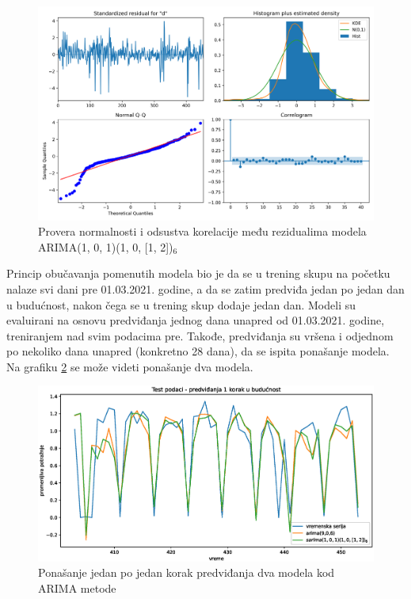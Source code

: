 \documentclass[12pt,oneside]{memoir}
\begin{document}
\begin{figure}[!ht]
  \centering
  \includegraphics[width=1\textwidth]{./grafici/reziduali_arima.png}
  \caption{Provera normalnosti i odsustva korelacije među rezidualima modela ARIMA(1, 0, 1)(1, 0, [1, 2])$_6$}
  \label{fig: reziduali}
\end{figure}
Princip obučavanja pomenutih modela bio je da se u trening skupu na početku nalaze svi dani pre 01.03.2021. godine, a da se zatim predviđa jedan po jedan dan u budućnost, nakon čega se u trening skup dodaje jedan dan. Modeli su evaluirani na osnovu predviđanja jednog dana unapred od 01.03.2021. godine, treniranjem nad svim podacima pre. Takođe, predviđanja su vršena i odjednom po nekoliko dana unapred (konkretno 28 dana), da se ispita ponašanje modela. Na grafiku \ref{fig: test_arima} se može videti ponašanje dva modela.
\begin{figure}[!ht]
  \centering
  \includegraphics[width=1\textwidth]{./grafici/test_dnevna_arima.eps}
  \caption{Ponašanje jedan po jedan korak predviđanja dva modela kod ARIMA metode}
  \label{fig: test_arima}
\end{figure}
\end{document}

